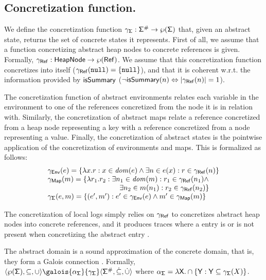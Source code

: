 \subsection{Concretization function.}
We define the concretization function $\gamma_{\mathsf{\Sigma}} : \mathsf{\Sigma}^\# \to \wp(\mathsf{\Sigma})$ that, given an abstract state, returns the set of concrete states it represents. First of all, we assume that a function concretizing abstract heap nodes to concrete references is given. Formally, $\gamma_{\mathsf{Ref}} : \mathsf{HeapNode} \to \wp(\mathsf{Ref})$. We assume that this concretization function concretizes  into itself ($\gamma_{\mathsf{Ref}}(\mathtt{null})=\{\mathtt{null}\}$), and that it is coherent w.r.t. the information provided by $\mathsf{isSummary}$ ($\neg \mathsf{isSummary}(n) \Leftrightarrow |\gamma_{\mathsf{Ref}}(n)|=1$).

The concretization function of abstract environments relates each variable in the environment to one of the references concretized from the node it is in relation with. Similarly, the concretization of abstract maps relate a reference concretized from a heap node representing a key with a reference concretized from a node representing a value. Finally, the concretization of abstract states is the pointwise application of the concretization of environments and maps. This is formalized as follows:
\[
\begin{array}{l}
\gamma_\env(e) = \{\lambda x . r : x \in \dom{e} \land \exists n \in e(x) : r \in \gamma_\reference(n)\}\\
\gamma_\map(m) = \{\lambda r_1 . r_2 : \exists n_1 \in \dom{m} : r_1 \in \gamma_\reference(n_1) \land\\
\hspace{100pt} \exists n_2 \in m(n_1) : r_2 \in \gamma_\reference(n_2) \}\\
\gamma_\state(e, m) = \{(e', m') : e' \in \gamma_\env(e) \land m' \in \gamma_\map(m)\}\\
\end{array}
\]

The concretization of local logs simply relies on $\gamma_{\mathsf{Ref}}$ to concretizes abstract heap nodes into concrete references, and it produces traces where a  entry is or is not present when concretizing the abstract entry .

\begin{lemma}
	The abstract domain is a sound approximation of the concrete domain, that is, they form a Galois connection \cite{CC77}. Formally, $\langle \wp(\state), \subseteq, \cup \rangle \galois{\alpha_\state}{\gamma_\state} \langle \astate, \dot{\subseteq}, \dot{\cup} \rangle$ where $\alpha_{\mathsf{\Sigma}} = \lambda \mathsf{X} . \cap \{\mathsf{Y} : \mathsf{Y} \subseteq \gamma_{\mathsf{\Sigma}}(X)\}$.
\end{lemma}


